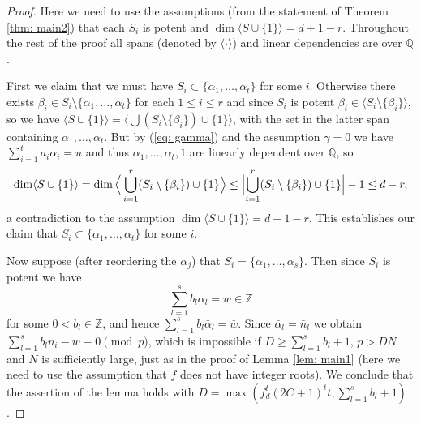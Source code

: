 \documentclass[10pt,a4paper]{amsart}
\newcommand{\Q}{{\mathbb Q}}
\newcommand{\Z}{{\mathbb Z}}
\newcommand{\case}[1]{\vspace{0.3cm}\noindent\framebox{#1.}}
\renewcommand{\Cup}{\bigcup}
\begin{document}
\begin{proof}
\case{$\gamma=0$} Here we need to use the assumptions (from the statement of Theorem \ref{thm: main2}) that each $S_i$ is potent and 
$\dim\langle S\cup\{1\}\rangle=d+1-r$. Throughout the rest of the proof all spans (denoted by $\langle\cdot\rangle$) and linear dependencies are over $\Q$. 

First we claim that we must have $S_i\subset\{\alpha_1,\ldots,\alpha_t\}$ for some $i$. Otherwise there exists $\beta_i\in S_i\setminus\{\alpha_1,\ldots,\alpha_t\}$ for each $1\le i\le r$ and since $S_i$ is potent $\beta_i\in\langle S_i\setminus\{\beta_i\}\rangle$, so we have
$\langle S\cup\{1\}\rangle=\langle \Cup(S_i\setminus\{\beta_i\})\cup\{1\}\rangle$, with the set in the latter span containing $\alpha_1,\ldots,\alpha_t$. But by (\ref{eq: gamma}) and the assumption $\gamma=0$ we have $\sum_{i=1}^ta_i\alpha_i=u$ and thus $\alpha_1,\ldots,\alpha_t,1$ are linearly dependent over $\Q$, so $$\dim\langle S\cup\{1\}\rangle=\dim\Big\langle \Cup_{i=1}^r(S_i\setminus\{\beta_i\})\cup\{1\}\Big\rangle\le\Bigl|\Cup_{i=1}^r(S_i\setminus\{\beta_i\})\cup\{1\}\Bigr|-1\le d-r,$$ a contradiction to the assumption $\dim\langle S\cup\{1\}\rangle=d+1-r$. This establishes our claim that $S_i\subset\{\alpha_1,\ldots,\alpha_t\}$ for some $i$.

Now suppose (after reordering the $\alpha_j$) that $S_i=\{\alpha_{1},\ldots,\alpha_{{s}}\}$. 
Then since $S_i$ is potent we have $$\sum_{l=1}^{s}b_l\alpha_{l}=w\in\Z$$ for some $0< b_l\in\Z$, and hence $\sum_{l=1}^{s}b_l\bar\alpha_{l}=\bar w$. Since $\bar\alpha_{l}=\bar n_{l}$ we obtain $\sum_{l=1}^{s}b_{l}n_{i}-w\equiv 0\pmod {p}$, which is impossible if $D\ge\sum_{l=1}^{s}b_{l}+1$, $p>DN$ and $N$ is sufficiently large, just as in the proof of Lemma \ref{lem: main1} (here we need to use the assumption that $f$ does not have integer roots). We conclude that the assertion of the lemma holds with $D=\max\left(f_d^t(2C+1)^tt,\sum_{l=1}^sb_l+1\right)$. 


\end{proof}
\end{document}
